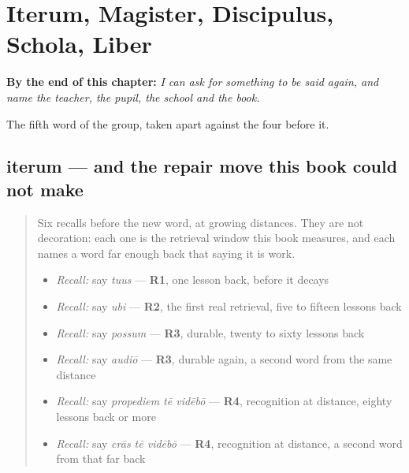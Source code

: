 
\chapter{Iterum, Magister, Discipulus, Schola, Liber}
\label{ch:la-schola}

\begin{chapteropening}
\textbf{By the end of this chapter:} \emph{I can ask for something to be said again, and name the teacher, the pupil, the school and the book.}

The fifth word of the group, taken apart against the four before it.
\end{chapteropening}

\section[iterum]{iterum — and the repair move this book could not make}

\label{lesson:LA-C53-iterum}



\begin{quote}
Six recalls before the new word, at growing distances. They are not decoration: each one is the retrieval window this book measures, and each names a word far enough back that saying it is work.

\begin{itemize}
\raggedright
  \item \emph{Recall:} say \emph{tuus} — \textbf{R1}, one lesson back, before it decays
  \item \emph{Recall:} say \emph{ubi} — \textbf{R2}, the first real retrieval, five to fifteen lessons back
  \item \emph{Recall:} say \emph{possum} — \textbf{R3}, durable, twenty to sixty lessons back
  \item \emph{Recall:} say \emph{audiō} — \textbf{R3}, durable again, a second word from the same distance
  \item \emph{Recall:} say \emph{propediem tē vidēbō} — \textbf{R4}, recognition at distance, eighty lessons back or more
  \item \emph{Recall:} say \emph{crās tē vidēbō} — \textbf{R4}, recognition at distance, a second word from that far back
\end{itemize}
\end{quote}

